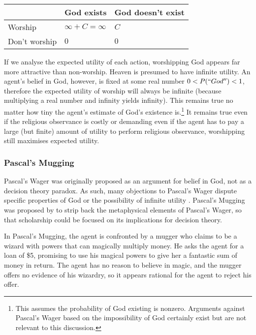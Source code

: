 \documentclass{article}
\begin{document}
\begin{center}
\begin{tabular}{ | l | l | l |}
  \hline
    & God exists & God doesn't exist \\ \hline
  Worship & \(\infty+C=\infty\) & \(C\) \\ \hline
  Don't worship & \(0\)  & \(0\) \\
  \hline
\end{tabular}
\end{center}

If we analyse the expected utility of each action, worshipping God appears far more attractive than non-worship. Heaven is presumed to have infinite utility. An agent's belief in God, however, is fixed at some real number \(0<P(``God'')<1\), therefore the expected utility of worship will always be infinite (because multiplying a real number and infinity yields infinity). This remains true no matter how tiny the agent's estimate of God's existence is.\footnote{This assumes the probability of God existing is nonzero. Arguments against Pascal's Wager based on the impossibility of God certainly exist \citep{oppy1991rescher} but are not relevant to this discussion.} It remains true even if the religious observance is costly or demanding \textemdash{} even if the agent has to pay a large (but finite) amount of utility to perform religious observance, worshipping still maximises expected utility.

\subsubsection {Pascal's Mugging}
Pascal's Wager was originally proposed as an argument for belief in God, not as a decision theory paradox. As such, many objections to Pascal's Wager dispute specific properties of God \citep{mackie1990miracle} or the possibility of infinite utility \citep{mcclennen1994pascal}. Pascal's Mugging was proposed by \citet{bostrom2009pascal} to strip back the metaphysical elements of Pascal's Wager, so that scholarship could be focused on its implications for decision theory.

In Pascal's Mugging, the agent is confronted by a mugger who claims to be a wizard with powers that can magically multiply money. He asks the agent for a loan of \$5, promising to use his magical powers to give her a fantastic sum of money in return. The agent has no reason to believe in magic, and the mugger offers no evidence of his wizardry, so it appears rational for the agent to reject his offer.
\end{document}
